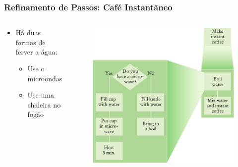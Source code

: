 \documentclass[xcolor={dvipsnames,table},aspectratio=169]{beamer}
\begin{document}
\begin{frame}\frametitle{Refinamento de Passos: Café Instantâneo}
\begin{columns}[T]
	\begin{column}{0.3\linewidth}
		\begin{itemize}
		\item Há duas formas de ferver a água:
		\begin{itemize}
			\item Use o microondas
			\item Use uma chaleira no fogão
		\end{itemize}
		\end{itemize}
	\end{column}
	\begin{column}{0.7\linewidth}\begin{figure}[h]
	\includegraphics[height=0.65\paperheight,center]{pucrs-ep-fprog-unidade_05-metodos-laminas-get_coffe_2.png}
\end{figure}
	\end{column}
\end{columns}
\end{frame}
\end{document}
